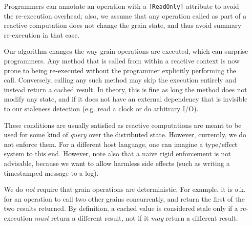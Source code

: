 Programmers can annotate an operation with a \lstinline|[ReadOnly]| attribute to avoid the re-execution overhead; also, we assume that any operation called as part of a reactive computation does not change the grain state, and thus avoid summary re-execution in that case.

Our algorithm changes the way grain operations are executed, which can surprise programmers.  Any method that is called from within a reactive context is now prone to being re-executed without the programmer explicitly performing the call. Conversely, calling any such method may skip the execution entirely and instead return a cached result. In theory, this is fine as long the method does not modify any state, and if it does not have an external dependency that is invisible to our staleness detection (e.g. read a clock or do arbitrary I/O). 

These conditions are usually satisfied as reactive computations are meant to be used for some kind of \emph{query} over the distributed state. However, currently, we do not enforce them. For a different host language, one can imagine a type/effect system to this end. However, note also that a naive rigid enforcement is not advisable, because we want to allow harmless side effects (such as writing a timestamped message to a log). 

We do \emph{not} require that grain operations are deterministic. For example, it is o.k. for an operation to call two other grains concurrently, and return the first of the two results returned. By definition, a cached value is considered stale only if a re-execution \emph{must} return a different result, not if it \emph{may} return a different result.
 
